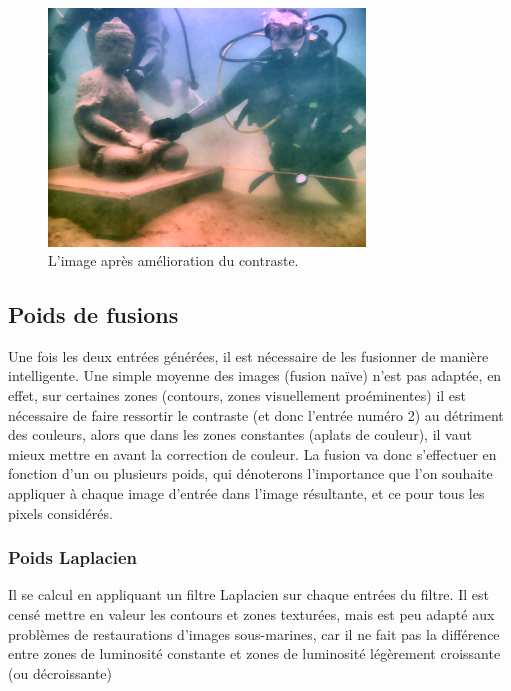 \documentclass[twoside]{article}
\begin{document}
\begin{figure}[]
  \centering
  \includegraphics[width=0.75\textwidth]{Support/contrast.png}
  \caption{L'image après amélioration du contraste.}
\end{figure}

\subsection{Poids de fusions}
Une fois les deux entrées générées, il est nécessaire de les fusionner de manière intelligente. Une simple moyenne des images (fusion naïve) n'est pas adaptée, en effet, sur certaines zones (contours, zones visuellement proéminentes) il est nécessaire de faire ressortir le contraste (et donc l'entrée numéro 2) au détriment des couleurs, alors que dans les zones constantes (aplats de couleur), il vaut mieux mettre en avant la correction de couleur. La fusion va donc s'effectuer en fonction d'un ou plusieurs poids, qui dénoterons l'importance que l'on souhaite appliquer à chaque image d'entrée dans l'image résultante, et ce pour tous les pixels considérés. 

\subsubsection{Poids Laplacien}

Il se calcul en appliquant un filtre Laplacien sur chaque entrées du filtre. Il est censé mettre en valeur les contours et zones texturées, mais est peu adapté aux problèmes de restaurations d'images sous-marines, car il ne fait pas la différence entre zones de luminosité constante et zones de luminosité légèrement croissante (ou décroissante)
\end{document}
